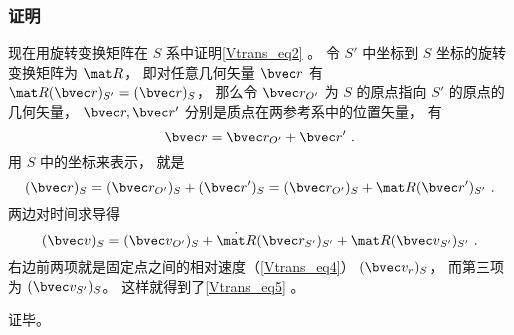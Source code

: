 \subsubsection{证明}
现在用旋转变换矩阵在 $S$ 系中证明\autoref{Vtrans_eq2} 。 令 $S'$ 中坐标到 $S$ 坐标的旋转变换矩阵为 $\mat R$， 即对任意几何矢量 $\bvec r$ 有 $\mat R (\bvec r)_{S'} = (\bvec r)_S$， 那么令 $\bvec r_{O'}$ 为 $S$ 的原点指向 $S'$ 的原点的几何矢量， $\bvec r, \bvec r'$ 分别是质点在两参考系中的位置矢量， 有
\begin{equation}
\bvec r = \bvec r_{O'} + \bvec r'~.
\end{equation}
用 $S$ 中的坐标来表示， 就是
\begin{equation}
(\bvec r)_S = (\bvec r_{O'})_S + (\bvec r')_S = (\bvec r_{O'})_S + \mat R(\bvec r')_{S'}~.
\end{equation}
两边对时间求导得
\begin{equation}
(\bvec v)_S = ({\bvec v}_{O'})_S + \dot{\mat R}(\bvec r_{S'})_{S'} + \mat R ({\bvec v}_{S'})_{S'}~.
\end{equation}
右边前两项就是固定点之间的相对速度（\autoref{Vtrans_eq4}） $(\bvec v_r)_S$， 而第三项为 $(\bvec v_{S'})_S$。 这样就得到了\autoref{Vtrans_eq5} 。

证毕。
